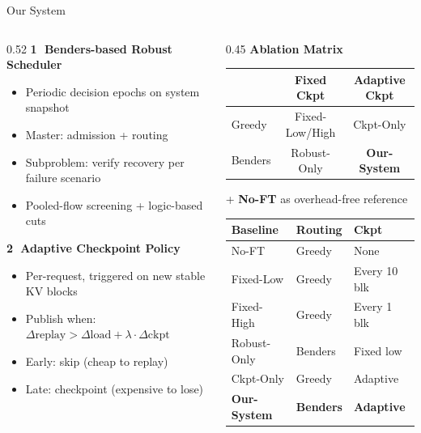\documentclass[aspectratio=169,12pt]{beamer}
\begin{document}
\begin{frame}{Our System}
\begin{columns}[T]
\begin{column}{0.52\textwidth}
\textbf{\textcircled{1} Benders-based Robust Scheduler}
\begin{itemize}
    \item Periodic decision epochs on system snapshot
    \item Master: admission + routing
    \item Subproblem: verify recovery per failure scenario
    \item Pooled-flow screening + logic-based cuts
\end{itemize}

\vspace{0.5em}
\textbf{\textcircled{2} Adaptive Checkpoint Policy}
\begin{itemize}
    \item Per-request, triggered on new stable KV blocks
    \item Publish when: $\Delta\text{replay} > \Delta\text{load} + \lambda \cdot \Delta\text{ckpt}$
    \item Early: skip (cheap to replay)
    \item Late: checkpoint (expensive to lose)
\end{itemize}
\end{column}
\begin{column}{0.45\textwidth}
\textbf{Ablation Matrix}

\vspace{0.3em}
\begin{tabular}{l|c|c}
 & \scriptsize Fixed Ckpt & \scriptsize Adaptive Ckpt \\
\hline
\scriptsize Greedy & \scriptsize Fixed-Low/High & \scriptsize Ckpt-Only \\
\scriptsize Benders & \scriptsize Robust-Only & \scriptsize \textbf{Our-System} \\
\end{tabular}

\vspace{0.5em}
+ \textbf{No-FT} as overhead-free reference

\vspace{0.8em}
{\scriptsize
\begin{tabular}{lll}
\toprule
\textbf{Baseline} & \textbf{Routing} & \textbf{Ckpt} \\
\midrule
No-FT & Greedy & None \\
Fixed-Low & Greedy & Every 10 blk \\
Fixed-High & Greedy & Every 1 blk \\
Robust-Only & Benders & Fixed low \\
Ckpt-Only & Greedy & Adaptive \\
\textbf{Our-System} & \textbf{Benders} & \textbf{Adaptive} \\
\bottomrule
\end{tabular}
}
\end{column}
\end{columns}
\end{frame}
\end{document}
